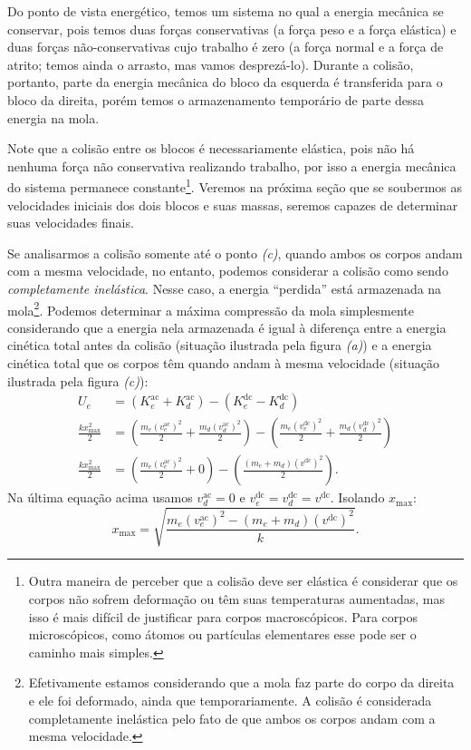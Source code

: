 Do ponto de vista energético, temos um sistema no qual a energia mecânica se conservar, pois temos duas forças conservativas (a força peso e a força elástica) e duas forças não-conservativas cujo trabalho é zero (a força normal e a força de atrito; temos ainda o arrasto, mas vamos desprezá-lo). Durante a colisão, portanto, parte da energia mecânica do bloco da esquerda é transferida para o bloco da direita, porém temos o armazenamento temporário de parte dessa energia na mola.

Note que a colisão entre os blocos é necessariamente elástica, pois não há nenhuma força não conservativa realizando trabalho, por isso a energia mecânica do sistema permanece constante\footnote{Outra maneira de perceber que a colisão deve ser elástica é considerar que os corpos não sofrem deformação ou têm suas temperaturas aumentadas, mas isso é mais difícil de justificar para corpos macroscópicos. Para corpos microscópicos, como átomos ou partículas elementares esse pode ser o caminho mais simples.}. Veremos na próxima seção que se soubermos as velocidades iniciais dos dois blocos e suas massas, seremos capazes de determinar suas velocidades finais.

Se analisarmos a colisão somente até o ponto \emph{(c)}, quando ambos os corpos andam com a mesma velocidade, no entanto, podemos considerar a colisão como sendo \emph{completamente inelástica}. Nesse caso, a energia ``perdida'' está armazenada na mola\footnote{Efetivamente estamos considerando que a mola faz parte do corpo da direita e ele foi deformado, ainda que temporariamente. A colisão é considerada completamente inelástica pelo fato de que ambos os corpos andam com a mesma velocidade.}. Podemos determinar a máxima compressão da mola simplesmente considerando que a energia nela armazenada é igual à diferença entre a energia cinética total antes da colisão (situação ilustrada pela figura \emph{(a)}) e a energia cinética total que os corpos têm quando andam à mesma velocidade (situação ilustrada pela figura \emph{(c)}):
\begin{align}
    U_e &= (K_e^{\text{ac}} + K_d^{\text{ac}}) - (K_e^{\text{dc}} - K_d^{\text{dc}}) \\
    \frac{kx_{\text{max}}^2}{2} &= \left(\frac{m_e(v_e^{\text{ac}})^2}{2} + \frac{m_d(v_d^{\text{ac}})^2}{2}\right) - \left(\frac{m_e(v_e^{\text{dc}})^2}{2} + \frac{m_d(v_d^{\text{dc}})^2}{2}\right) \\
    \frac{kx_{\text{max}}^2}{2} &= \left(\frac{m_e(v_e^{\text{ac}})^2}{2} + 0\right) - \left(\frac{(m_e + m_d)(v^{\text{dc}})^2}{2}\right).
\end{align}
%
Na última equação acima usamos $v_d^{\text{ac}} = 0$ e $v_e^{\text{dc}} = v_d^{\text{dc}} = v^{\text{dc}}$. Isolando $x_{\text{max}}$:
\begin{equation}
    x_{\text{max}} = \sqrt{\frac{m_e(v_e^{\text{ac}})^2 - (m_e + m_d)(v^{\text{dc}})^2}{k}}.
\end{equation}

